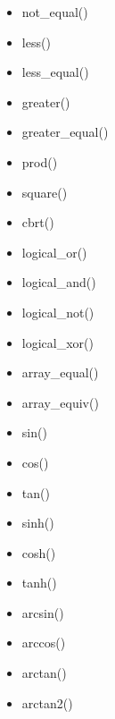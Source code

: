 \documentclass{article}
\begin{document}
\begin{itemize}
  \item not\_equal()
  \item less()
  \item less\_equal()
  \item greater()
  \item greater\_equal()
  \item prod()
  \item square()
  \item cbrt()
  \item logical\_or()
  \item logical\_and()
  \item logical\_not()
  \item logical\_xor()
  \item array\_equal()
  \item array\_equiv()
  \item sin()
  \item cos()
  \item tan()
  \item sinh()
  \item cosh()
  \item tanh()
  \item arcsin()
  \item arccos()
  \item arctan()
  \item arctan2()
\end{itemize}
\end{document}
